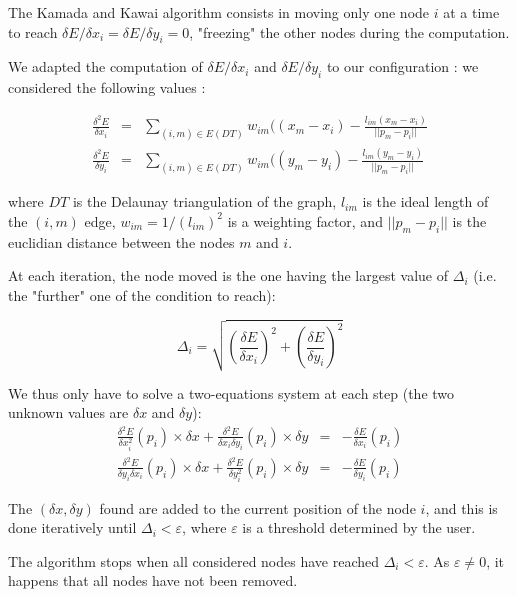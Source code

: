 \documentclass[12pt]{report}
\begin{document}
\bigskip
The Kamada and Kawai algorithm consists in moving only one node $i$ at a time to reach $\delta E / \delta x_i = \delta E / \delta y_i = 0$, "freezing" the other nodes during the computation.

We adapted the computation of $\delta E / \delta x_i$ and $\delta E / \delta y_i$ to our configuration : we considered the following values :

\begin{eqnarray*}
\frac{\delta^2 E}{\delta x_i}  & = & \sum_{(i,m) \in E(DT)} w_{im} ( (x_m - x_i) - \frac{l_{im} (x_m - x_i)}{||p_m - p_i||} \\
\frac{\delta^2 E}{\delta y_i}  & = & \sum_{(i,m) \in E(DT)} w_{im} ( (y_m - y_i) - \frac{l_{im} (y_m - y_i)}{||p_m - p_i||}
\end{eqnarray*}
 
where $DT$ is the Delaunay triangulation of the graph, $l_{im}$ is the ideal length of the $(i,m)$ edge, $w_{im} = 1/(l_{im})^2 $ is a weighting factor, and $||p_m - p_i||$ is the euclidian distance between the nodes $m$ and $i$.

At each iteration, the node moved is the one having the largest value of $\Delta_i$ (i.e. the "further" one of the condition to reach):

\[\Delta_i = \sqrt{\left(\frac{\delta E}{\delta x_i}\right)^2 + \left(\frac{\delta E}{\delta y_i}\right)^2} \]


\bigskip
We thus only have to solve a two-equations system at each step (the two unknown values are $\delta x$ and $\delta y$):
\begin{eqnarray*}
\frac{\delta^2 E}{\delta x_i^2}(p_i) \times \delta x +  \frac{\delta^2 E}{\delta x_i \delta y_i}(p_i) \times \delta y  & = & - \frac{\delta E}{\delta x_i} (p_i) \\
\frac{\delta^2 E}{\delta y_i \delta x_i}(p_i) \times \delta x +  \frac{\delta^2 E}{\delta y_i^2}(p_i) \times \delta y & = & - \frac{\delta E}{\delta y_i} (p_i)
\end{eqnarray*}

The $(\delta x, \delta y)$ found are added to the current position of the node $i$, and this is done iteratively until $\Delta_i < \varepsilon$, where $\varepsilon$ is a threshold determined by the user.

The algorithm stops when all considered nodes have reached $\Delta_i < \varepsilon$. As $\varepsilon \neq 0$, it happens that all nodes have not been removed.
\end{document}
